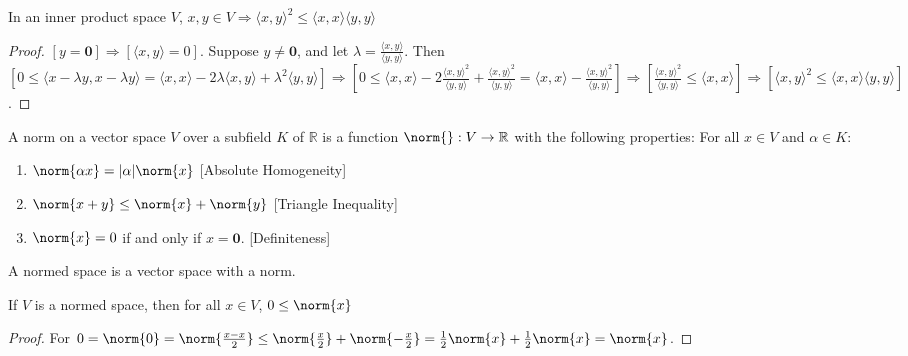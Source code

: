 \documentclass[crop=false,class=book,oneside]{standalone}
\begin{document}
            \begin{theorem}
            In an inner product space $V$, $x,y\in V\Rightarrow \langle x,y \rangle^2 \leq \langle x,x \rangle \langle y,y \rangle$
            \end{theorem}
            \begin{proof}
            $[y=\mathbf{0}]\Rightarrow [\langle x,y\rangle = 0]$. Suppose $y\ne \mathbf{0}$, and let $\lambda = \frac{\langle x,y \rangle}{\langle y,y \rangle}$. Then $[0 \leq \langle x-\lambda y, x-\lambda y\rangle = \langle x,x \rangle - 2\lambda \langle x,y \rangle + \lambda^2 \langle y,y \rangle]\Rightarrow [0\leq \langle x,x \rangle - 2\frac{\langle x,y \rangle ^2 }{\langle y,y \rangle} + \frac{\langle x,y \rangle^2}{\langle y,y \rangle} = \langle x,x \rangle - \frac{\langle x,y \rangle^2}{\langle y,y \rangle}]\Rightarrow [\frac{\langle x,y \rangle ^2}{\langle y,y \rangle} \leq \langle x,x \rangle]\Rightarrow [\langle x,y \rangle^2 \leq \langle x,x \rangle \langle y,y \rangle]$.
            \end{proof}
            \begin{definition}
            A norm on a vector space $V$ over a subfield $K$ of $\mathbb{R}$ is a function $\norm{}:V\rightarrow \mathbb{R}$ with the following properties: For all $x \in V$ and $\alpha \in K$:
            \begin{enumerate}
            \item $\norm{\alpha x} = |\alpha| \norm{x}$ \hfill [Absolute Homogeneity]
            \item $\norm{x+y} \leq \norm{x}+\norm{y}$ \hfill [Triangle Inequality]
            \item $\norm{x} = 0$ if and only if $x = \mathbf{0}$. \hfill [Definiteness]
            \end{enumerate}
            \end{definition}
            \begin{definition}
            A normed space is a vector space with a norm.
            \end{definition}
            \begin{theorem}
            If $V$ is a normed space, then for all $x\in V$, $0\leq \norm{x}$
            \end{theorem}
            \begin{proof}
            For $0=\norm{0} = \norm{\frac{x-x}{2}} \leq \norm{\frac{x}{2}}+\norm{-\frac{x}{2}} = \frac{1}{2}\norm{x} + \frac{1}{2}\norm{x} = \norm{x}$.
            \end{proof}
\end{document}
